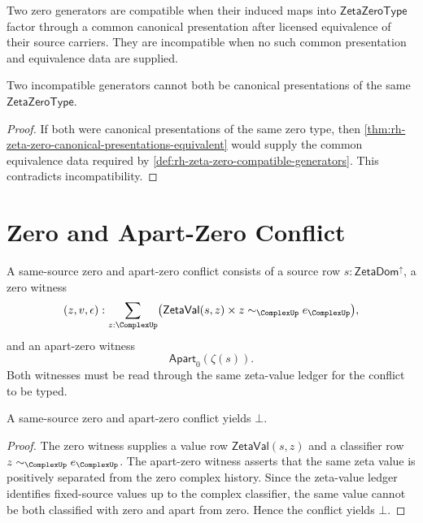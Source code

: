 \begin{definition}
\label{def:rh-zeta-zero-compatible-generators}
Two zero generators are compatible when their induced maps into
$\mathsf{ZetaZeroType}$ factor through a common canonical presentation
after licensed equivalence of their source carriers. They are incompatible
when no such common presentation and equivalence data are supplied.
\end{definition}

\begin{corollary}
\label{cor:rh-zeta-zero-incompatible-canonical-generators}
Two incompatible generators cannot both be canonical presentations of the
same $\mathsf{ZetaZeroType}$.
\end{corollary}

\begin{proof}
If both were canonical presentations of the same zero type, then
\autoref{thm:rh-zeta-zero-canonical-presentations-equivalent} would supply
the common equivalence data required by
\autoref{def:rh-zeta-zero-compatible-generators}. This contradicts
incompatibility.
\end{proof}

\section{Zero and Apart-Zero Conflict}
\label{sec:rh-zeta-zero-apart-conflict}

\begin{definition}
\label{def:rh-zeta-zero-same-source-apart-conflict}
A same-source zero and apart-zero conflict consists of a source row
$s:\mathsf{ZetaDom}^{\uparrow}$, a zero witness
$$
(z,v,\epsilon):
\sum_{z:\ComplexUp}
\bigl(
\mathsf{ZetaVal}(s,z)
\times
z\sim_{\ComplexUp}e_{\ComplexUp}
\bigr),
$$
and an apart-zero witness
$$
\mathsf{Apart}_{0}(\zeta(s)).
$$
Both witnesses must be read through the same zeta-value ledger for the
conflict to be typed.
\end{definition}

\begin{theorem}
\label{thm:rh-zeta-zero-apart-conflict-impossible}
A same-source zero and apart-zero conflict yields $\bot$.
\end{theorem}

\begin{proof}
The zero witness supplies a value row $\mathsf{ZetaVal}(s,z)$ and a
classifier row $z\sim_{\ComplexUp}e_{\ComplexUp}$. The apart-zero witness
asserts that the same zeta value is positively separated from the zero
complex history. Since the zeta-value ledger identifies fixed-source
values up to the complex classifier, the same value cannot be both
classified with zero and apart from zero. Hence the conflict yields
$\bot$.
\end{proof}

